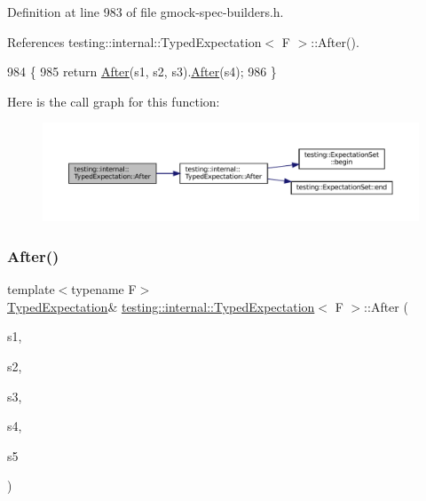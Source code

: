 Definition at line 983 of file gmock-\/spec-\/builders.\+h.



References testing\+::internal\+::\+Typed\+Expectation$<$ F $>$\+::\+After().


\begin{DoxyCode}
984                                                                               \{
985     \textcolor{keywordflow}{return} \hyperlink{classtesting_1_1internal_1_1TypedExpectation_a30f320d18ebf1a40e94883d7a56c6c8c}{After}(s1, s2, s3).\hyperlink{classtesting_1_1internal_1_1TypedExpectation_a30f320d18ebf1a40e94883d7a56c6c8c}{After}(s4);
986   \}
\end{DoxyCode}
Here is the call graph for this function\+:
\nopagebreak
\begin{figure}[H]
\begin{center}
\leavevmode
\includegraphics[width=350pt]{classtesting_1_1internal_1_1TypedExpectation_a1749e368f659352ed8375512acafc178_cgraph}
\end{center}
\end{figure}
\mbox{\label{classtesting_1_1internal_1_1TypedExpectation_a72c0105b147ee2995d183c8e4109f6ca}} 
\subsubsection{\texorpdfstring{After()}{After()}\hspace{0.1cm}{\footnotesize\ttfamily [5/5]}}
{\footnotesize\ttfamily template$<$typename F$>$ \\
\hyperlink{classtesting_1_1internal_1_1TypedExpectation}{Typed\+Expectation}\& \hyperlink{classtesting_1_1internal_1_1TypedExpectation}{testing\+::internal\+::\+Typed\+Expectation}$<$ F $>$\+::After (\begin{DoxyParamCaption}\item[{const \hyperlink{classtesting_1_1ExpectationSet}{Expectation\+Set} \&}]{s1,  }\item[{const \hyperlink{classtesting_1_1ExpectationSet}{Expectation\+Set} \&}]{s2,  }\item[{const \hyperlink{classtesting_1_1ExpectationSet}{Expectation\+Set} \&}]{s3,  }\item[{const \hyperlink{classtesting_1_1ExpectationSet}{Expectation\+Set} \&}]{s4,  }\item[{const \hyperlink{classtesting_1_1ExpectationSet}{Expectation\+Set} \&}]{s5 }\end{DoxyParamCaption})\hspace{0.3cm}{\ttfamily [inline]}}




